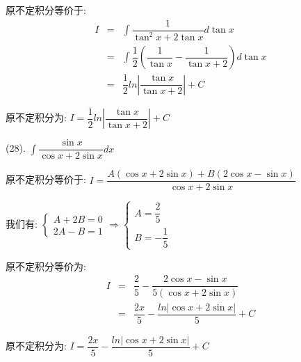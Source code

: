 \begin{anymark}[积分训练]
\begin{solution}
		原不定积分等价于:  
		\begin{eqnarray*}
			I&=&\int \dfrac{1}{\tan^2 x+2\tan x}d\tan x\\
			&=&\int\dfrac{1}{2}\left(\dfrac{1}{\tan x}-\dfrac{1}{\tan x+2}\right)d\tan x\\
			&=&\dfrac{1}{2}ln|\dfrac{\tan x}{\tan x+2}|+C 
		\end{eqnarray*}
	
	原不定积分为:  $I=\dfrac{1}{2}ln|\dfrac{\tan x}{\tan x+2}|+C $
	\end{solution}
	(28). $\int \dfrac{\sin x}{\cos x+2\sin x}dx$
	\begin{solution}
		
		原不定积分等价于:  $I=\dfrac{A(\cos x+2\sin x)+B(2\cos x-\sin x)}{\cos x+2\sin x}$
		
		我们有:  $\left\lbrace
		\begin{array}{l}
			A+2B=0\\
			2A-B=1
		\end{array}
		\right. \Rightarrow \left\lbrace
		\begin{array}{l}
			A=\dfrac{2}{5}\\
			B=-\dfrac{1}{5}
		\end{array}
		\right. $
		
		原不定积分等价为:  
		\begin{eqnarray*}
			I&=&\dfrac{2}{5}-\dfrac{2\cos x-\sin x}{5(\cos x+2\sin x)}\\
			&=&\dfrac{2x}{5}-\dfrac{ln|\cos x+2\sin x|}{5}+C
		\end{eqnarray*}
	
	原不定积分为:  $I=\dfrac{2x}{5}-\dfrac{ln|\cos x+2\sin x|}{5}+C$
	\end{solution}
\end{anymark}


